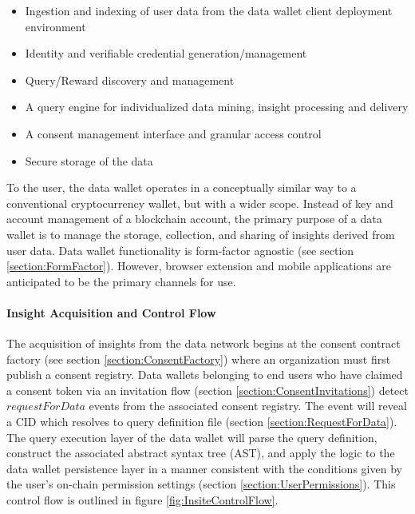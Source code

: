 \begin{itemize}
  \item Ingestion and indexing of user data from the data wallet client deployment environment
  \item Identity and verifiable credential generation/management
  \item Query/Reward discovery and management
  \item A query engine for individualized data mining, insight processing and delivery
  \item A consent management interface and granular access control
  \item Secure storage of the data
\end{itemize}

To the user, the data wallet operates in a conceptually similar way to a conventional cryptocurrency wallet, but with a wider scope. 
Instead of key and account management of a blockchain account, the primary purpose of a data wallet is to manage the storage, collection, and sharing of insights derived 
from user data. Data wallet functionality is form-factor agnostic (see section \ref{section:FormFactor}). However, browser extension and 
mobile applications are anticipated to be the primary channels for use.

\paragraph{Insight Acquisition and Control Flow}
\label{section:AquisitionControlFlow}



The acquisition of insights from the data network begins at the consent contract factory (see section \ref{section:ConsentFactory}) where an organization 
must first publish a consent registry. Data wallets belonging to end users who have claimed a consent token via an invitation flow (section \ref{section:ConsentInvitations})
detect $requestForData$ events from the associated consent registry. The event will reveal a CID which resolves to query definition file (section \ref{section:RequestForData}). 
The query execution layer of the data wallet will parse the query definition, construct the associated abstract syntax tree (AST), and apply the logic to the
data wallet persistence layer in a manner consistent with the conditions given by the user's on-chain permission settings (section \ref{section:UserPermissions}). This
control flow is outlined in figure \ref{fig:InsiteControlFlow}.

